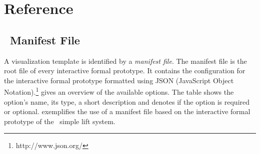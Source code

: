 \section{Reference}
\label{reference}

\subsection{\bms\ Manifest File}
\label{sec:manifest}

A visualization template is identified by a \textit{manifest file}.
The manifest file is the root file of every interactive formal prototype.
It contains the configuration for the interactive formal prototype formatted using JSON (JavaScript Object Notation).\footnote{http://www.json.org/}
 gives an overview of the available options.
The table shows the option's name, its type, a short description and denotes if the option is required or optional.
 exemplifies the use of a manifest file based on the interactive formal prototype of the \eventB\ simple lift system.
	
